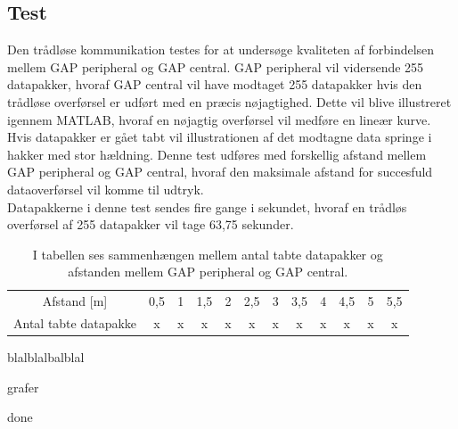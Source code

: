 \subsection{Test}
Den trådløse kommunikation testes for at undersøge kvaliteten af forbindelsen mellem GAP peripheral og GAP central. GAP peripheral vil vidersende 255 datapakker, hvoraf GAP central vil have modtaget 255 datapakker hvis den trådløse overførsel er udført med en præcis nøjagtighed. Dette vil blive illustreret igennem MATLAB, hvoraf en nøjagtig overførsel vil medføre en lineær kurve. Hvis datapakker er gået tabt vil illustrationen af det modtagne data springe i hakker med stor hældning. Denne test udføres med forskellig afstand mellem GAP peripheral og GAP central, hvoraf den maksimale afstand for succesfuld dataoverførsel vil komme til udtryk. \\
Datapakkerne i denne test sendes fire gange i sekundet, hvoraf en trådløs overførsel af 255 datapakker vil tage 63,75 sekunder. 
\begin{table}[H]
	\centering
	\begin{tabular}{cccccccccccc}
		\rowcolor[HTML]{C0C0C0} 
		Afstand {[}m{]} & 0,5 & 1 & 1,5 & 2 & 2,5 & 3 & 3,5 & 4 & 4,5 & 5 & 5,5 \\
		Antal tabte datapakke & x & x & x & x & x & x & x & x & x & x & x
	\end{tabular}
	\caption{I tabellen ses sammenhængen mellem antal tabte datapakker og afstanden mellem GAP peripheral og GAP central.}
	\label{test:ble_overforsel}
\end{table}


blalblalbalblal


grafer 

done
